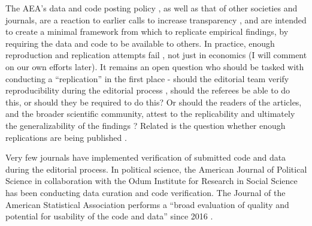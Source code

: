 \documentclass[AEJ]{AEA}
\begin{document}
The \ac{AEA}'s data and code posting policy \citep{American_Economic_Association2008-az}, as well as that of other societies and journals, are a reaction to earlier calls to increase transparency \citep{McCullough2006-cz,AndersonJ.Econ.Methodol.2008}, and are intended to create a minimal framework from which to replicate empirical findings, by requiring the data and code to be available to others. In practice, enough reproduction and replication attempts fail \citep{CamererScience2016,Chang2015-dl,ChangAm.Econ.Rev.2017}, not just in economics \citep{Baker2015-sh,Collaboration2015-ev} (I will comment on our own efforts later). It remains an open question who should be tasked with conducting a ``replication'' in the first place - should the editorial team verify reproducibility during the editorial process \citep{JacobyInsideHigherEd2017}, should the referees be able to do this, or should they be required to do this? Or should the readers of the articles, and the broader scientific community, attest to the replicability and ultimately the generalizability of the findings \citep{Hamermesh2017-kq}? Related is the question whether  enough replications are being published \citep{BerryAm.Econ.Rev.2017,Burman2010-ng,Coffman2017-si,Duvendack2017-js,Hoffler-LibMag.2017}.

Very few journals have implemented verification of submitted code and data during the editorial process. In political science, the American Journal of Political Science in collaboration with the Odum Institute for Research in Social Science \citep{Christian2018} has been conducting data curation and code verification. The Journal of the American Statistical Association performs a ``broad evaluation of quality and potential for usability of the code and data'' since 2016 \citep{Stodden2016-uc}.


\end{document}
